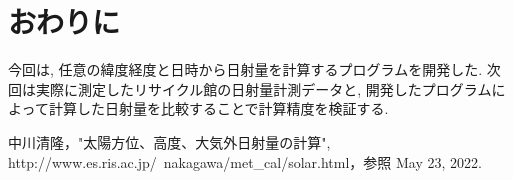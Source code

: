 \documentclass[a4j,12pt,]{jarticle}
\begin{document}
\section{おわりに}
今回は, 任意の緯度経度と日時から日射量を計算するプログラムを開発した.
次回は実際に測定したリサイクル館の日射量計測データと, 開発したプログラムによって計算した日射量を比較することで計算精度を検証する.

\begin{thebibliography}{5}
  中川清隆，"太陽方位、高度、大気外日射量の計算", http://www.es.ris.ac.jp/~nakagawa/met\_cal/solar.html，参照 May 23, 2022.
\end{thebibliography}
\end{document}
